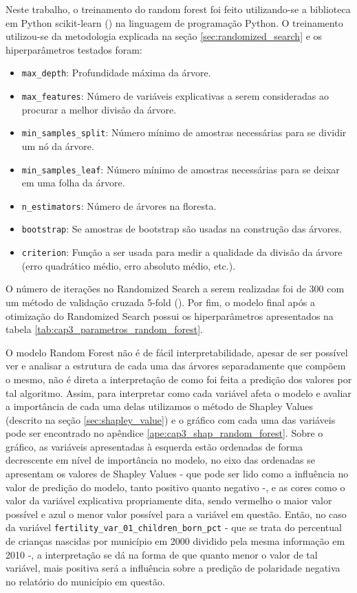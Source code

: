 Neste trabalho, o treinamento do random forest foi feito utilizando-se a biblioteca em Python scikit-learn (\citet{Sklearn}) na linguagem de programação Python. O treinamento utilizou-se da metodologia explicada na seção \ref{sec:randomized_search} e os hiperparâmetros testados foram:

\begin{itemize}
	\item \verb|max_depth|: Profundidade máxima da árvore.
	\item \verb|max_features|: Número de variáveis explicativas a serem consideradas ao procurar a melhor divisão da árvore.
	\item \verb|min_samples_split|: Número mínimo de amostras necessárias para se dividir um nó da árvore.
	\item \verb|min_samples_leaf|: Número mínimo de amostras necessárias para se deixar em uma folha da árvore.
	\item \verb|n_estimators|: Número de árvores na floresta.
	\item \verb|bootstrap|: Se amostras de bootstrap são usadas na construção das árvores.
	\item \verb|criterion|: Função a ser usada para medir a qualidade da divisão da árvore (erro quadrático médio, erro absoluto médio, etc.).
\end{itemize}

O número de iterações no Randomized Search a serem realizadas foi de 300 com um método de validação cruzada 5-fold (\citet{Kohavi1995}). Por fim, o modelo final após a otimização do Randomized Search possui os hiperparâmetros apresentados na tabela \ref{tab:cap3_parametros_random_forest}.

O modelo Random Forest não é de fácil interpretabilidade, apesar de ser possível ver e analisar a estrutura de cada uma das árvores separadamente que compõem o mesmo, não é direta a interpretação de como foi feita a predição dos valores por tal algoritmo. Assim, para interpretar como cada variável afeta o modelo e avaliar a importância de cada uma delas utilizamos o método de Shapley Values (descrito na seção \ref{sec:shapley_value}) e o gráfico com cada uma das variáveis pode ser encontrado no apêndice \ref{ape:cap3_shap_random_forest}. Sobre o gráfico, as variáveis apresentadas à esquerda estão ordenadas de forma decrescente em nível de importância no modelo, no eixo das ordenadas se apresentam os valores de Shapley Values - que pode ser lido como a influência no valor de predição do modelo, tanto positivo quanto negativo -, e as cores como o valor da variável explicativa propriamente dita, sendo vermelho o maior valor possível e azul o menor valor possível para a variável em questão. Então, no caso da variável \verb|fertility_var_01_children_born_pct| - que se trata do percentual de crianças nascidas por município em 2000 dividido pela mesma informação em 2010 -, a interpretação se dá na forma de que quanto menor o valor de tal variável, mais positiva será a influência sobre a predição de polaridade negativa no relatório do município em questão.

